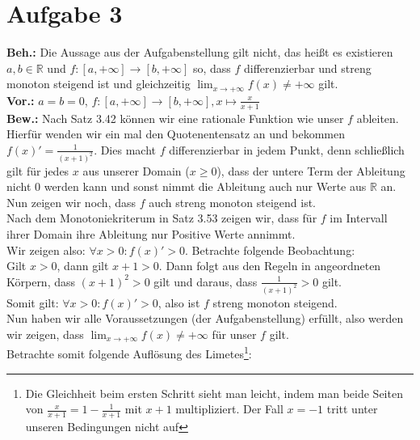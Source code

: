 \documentclass[12pt, a4paper]{article}
\begin{document}
\section*{Aufgabe 3}
\textbf{Beh.:} Die Aussage aus der Aufgabenstellung gilt nicht, das heißt es existieren \(a,b \in \mathbb{R}\) und \(f: [a,+\infty] \rightarrow [b,+\infty]\) so, dass \(f\) differenzierbar und streng monoton steigend ist und gleichzeitig \(\lim_{x \rightarrow +\infty} f(x) \ne +\infty\) gilt. \\
\textbf{Vor.:} \(a = b = 0\), \(f: [a,+\infty] \rightarrow [b,+\infty], x \mapsto \frac{x}{x+1}\) \\
\textbf{Bew.:} Nach Satz 3.42 können wir eine rationale Funktion wie unser \(f\) ableiten. Hierfür wenden wir ein mal den Quotenentensatz an und bekommen \(f(x)' = \frac{1}{(x+1)^2}\). Dies macht \(f\) differenzierbar in jedem Punkt, denn schließlich gilt für jedes \(x\) aus unserer Domain (\(x \ge 0\)), dass der untere Term der Ableitung nicht 0 werden kann und sonst nimmt die Ableitung auch nur Werte aus \(\mathbb{R}\) an.\\
Nun zeigen wir noch, dass \(f\) auch streng monoton steigend ist.\\
Nach dem Monotoniekriterum in Satz 3.53 zeigen wir, dass für \(f\) im Intervall ihrer Domain ihre Ableitung nur Positive Werte annimmt. \\
Wir zeigen also: \(\forall x > 0: f(x)' > 0\). Betrachte folgende Beobachtung: \\
Gilt \(x > 0\), dann gilt \(x + 1 > 0\). Dann folgt aus den Regeln in angeordneten Körpern, dass \((x + 1)^2 > 0\) gilt und daraus, dass \(\frac{1}{(x+1)^2} > 0\) gilt. \\
Somit gilt: \(\forall x > 0: f(x)' > 0\), also ist \(f\) streng monoton steigend. \\
Nun haben wir alle Voraussetzungen (der Aufgabenstellung) erfüllt, also werden wir zeigen, dass \(\lim_{x \rightarrow +\infty} f(x) \ne +\infty\) für unser \(f\) gilt. \pagebreak \\
Betrachte somit folgende Auflösung des Limetes\footnote{Die Gleichheit beim ersten Schritt sieht man leicht, indem man beide Seiten von \(\frac{x}{x+1} = 1 - \frac{1}{x+1}\) mit \(x+1\) multipliziert. Der Fall \(x = -1\) tritt unter unseren Bedingungen nicht auf}:
\end{document}
